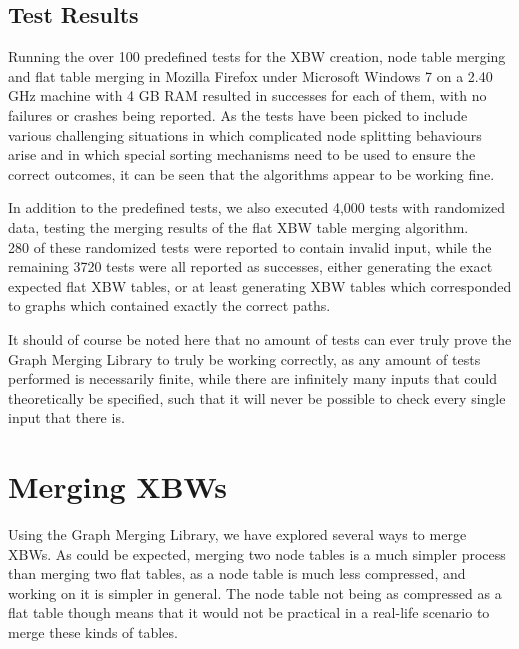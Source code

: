 \documentclass[a4paper,12pt,twoside,BCOR=10mm]{scrbook}
\begin{document}
\subsection{Test Results}

Running the over 100 predefined tests for the XBW creation, node table merging 
and flat table merging in Mozilla Firefox under Microsoft Windows 7 on a 2.40 GHz machine with 4 GB RAM 
resulted in successes for each of them, 
with no failures or crashes being reported. 
As the tests have been picked to include various challenging situations 
in which complicated node splitting behaviours arise and in which 
special sorting mechanisms need to be used to ensure the correct outcomes, 
it can be seen that the algorithms appear to be working fine.

In addition to the predefined tests, we also executed 4,000 tests with randomized data, 
testing the merging results of the flat XBW table merging algorithm. \\
280 of these randomized tests were reported to contain invalid input, 
while the remaining 3720 tests were all reported as successes, 
either generating the exact expected flat XBW tables, or at least 
generating XBW tables which corresponded to graphs which contained exactly the 
correct paths.


It should of course be noted here that no amount of tests can ever 
truly prove the Graph Merging Library to truly be working correctly, 
as any amount of tests performed is necessarily finite, while there are 
infinitely many inputs that could theoretically be specified, 
such that it will never be possible to check every single input that there is.

\section{Merging XBWs}
%

Using the Graph Merging Library, we have explored several ways to merge XBWs. 
As could be expected, merging two node tables is a much simpler process than merging two flat tables, 
as a node table is much less compressed, and working on it is simpler in general. 
The node table not being as compressed as a flat table though means 
that it would not be practical in a real-life scenario to merge these kinds of tables.
\end{document}
